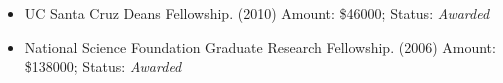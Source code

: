 \documentclass[margin,line,12pt]{res}
\begin{document}
\begin{resume}
\begin{itemize}
\item UC Santa Cruz Deans Fellowship. (2010) Amount: \$46000; Status: \emph{Awarded}

\item National Science Foundation Graduate Research Fellowship. (2006) Amount: \$138000; Status: \emph{Awarded}












\end{itemize}
\end{resume}
\end{document}
